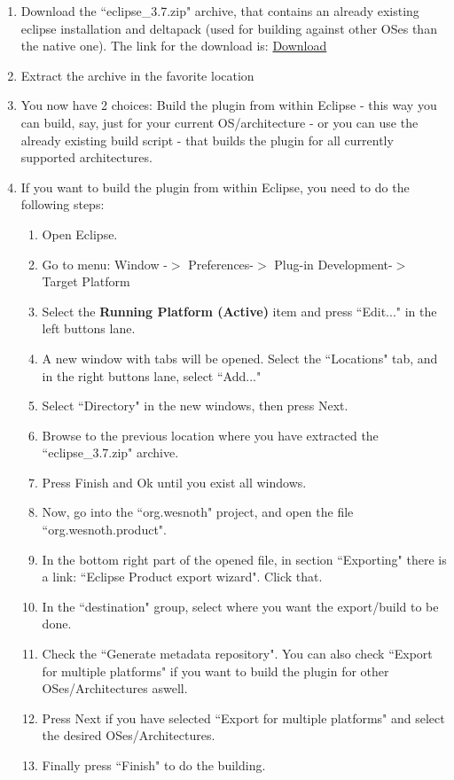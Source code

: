 \documentclass[10pt]{article}
\begin{document}
\begin{enumerate}
  \item Download the ``eclipse\_3.7.zip" archive, that contains an already existing eclipse installation and deltapack (used for building against other OSes than the native one). The link for the download is: \href{http://sourceforge.net/projects/wesnoth/files/wesnoth-umcplugin/build\_utils/eclipse\_3.7.zip/download}{Download}

  \item Extract the archive in the favorite location

  \item You now have 2 choices: Build the plugin from within Eclipse - this way you can build, say, just for your current OS/architecture - or you can use the already existing build script - that builds the plugin for all currently supported architectures.

  \item If you want to build the plugin from within Eclipse, you need to do the following steps:
  \begin{enumerate}
    \item Open Eclipse.
    \item Go to menu: Window -$>$ Preferences-$>$ Plug-in Development-$>$ Target Platform
    \item Select the \textbf{Running Platform (Active)} item and press ``Edit..." in the left buttons lane.
    \item A new window with tabs will be opened. Select the ``Locations" tab, and in the right buttons lane, select ``Add..."
    \item Select ``Directory" in the new windows, then press Next.
    \item Browse to the previous location where you have extracted the ``eclipse\_3.7.zip" archive.
    \item Press Finish and Ok until you exist all windows.
    \item Now, go into the ``org.wesnoth" project, and open the file ``org.wesnoth.product".
    \item In the bottom right part of the opened file, in section ``Exporting" there is a link: ``Eclipse Product export wizard". Click that.
    \item In the ``destination" group, select where you want the export/build to be done.
    \item Check the ``Generate metadata repository". You can also check ``Export for multiple platforms" if you want to build the plugin for other OSes/Architectures aswell.
    \item Press Next if you have selected ``Export for multiple platforms" and select the desired OSes/Architectures.
    \item Finally press ``Finish" to do the building.
  \end{enumerate}


\end{enumerate}
\end{document}
